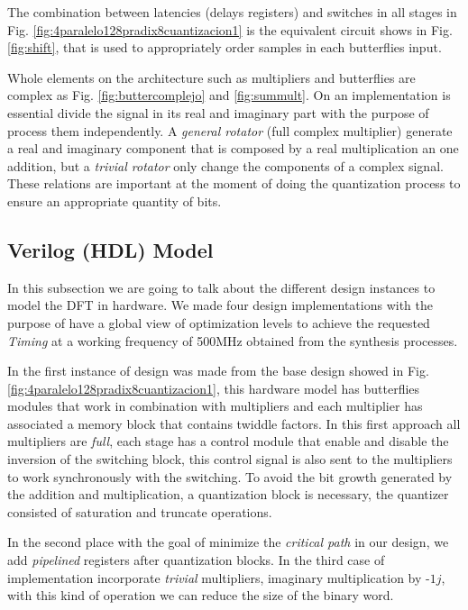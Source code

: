 \documentclass[journal,comsoc]{IEEEtran}
\begin{document}
The combination between latencies (delays registers) and switches in all stages in Fig. \ref{fig:4paralelo128pradix8cuantizacion1} is the equivalent circuit shows in Fig. \ref{fig:shift}, that is used to appropriately order samples in each butterflies input.

Whole elements on the architecture such as multipliers and butterflies are complex as Fig. \ref{fig:buttercomplejo} and \ref{fig:summult}. On an implementation is essential divide the signal in its real and imaginary part with the purpose of process them independently. A \textit{general rotator} (full complex multiplier) generate a real and imaginary component that is composed by a real multiplication an one addition, but a \textit{trivial rotator} only change the components of a complex signal. These relations are important at the moment of doing the quantization process to ensure an appropriate quantity of bits.



\subsection{Verilog (HDL) Model} 
In this subsection we are going to talk about the different design instances to model the DFT in hardware. 
We made four design implementations with the purpose of have a global view of optimization levels to achieve the requested \textit{Timing} at a working frequency of 500MHz obtained from the synthesis processes.

In the first instance of design was made from the base design showed in Fig. \ref{fig:4paralelo128pradix8cuantizacion1}, this hardware model has butterflies modules that work in combination with multipliers and each multiplier has associated a memory block that contains twiddle factors. In this first approach all multipliers are \textit{full}, each stage has a control module that enable and disable the inversion of the switching block, this control signal is also sent to the multipliers to work synchronously with the switching. To avoid the bit growth generated by the addition and multiplication, a quantization block is necessary, the quantizer consisted of saturation and truncate operations.

In the second place with the goal of minimize the \textit{critical path} in our design, we add \textit{pipelined} registers after quantization blocks. In the third case of implementation incorporate \textit{trivial} multipliers, imaginary multiplication by -$1j$, with this kind of operation we can reduce the size of the binary word. 
\end{document}
